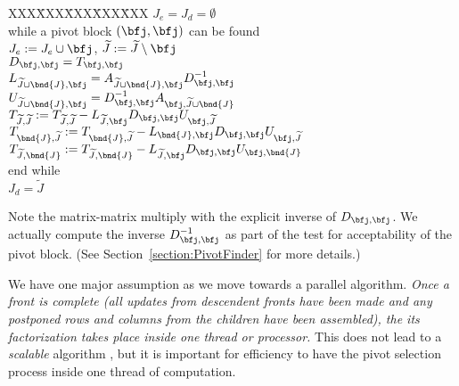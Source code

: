 \begin{center}
\begin{minipage}{3.5 in}
\begin{tabbing}
XXX\=XXX\=XXX\=XXX\=XXX\kill
$J_e = J_d = \emptyset$ \\
while a pivot block $(\bfj, \bfj)$ can be found \\
\> $J_e := J_e \cup \bfj$,
   ${\widetilde J} := {\widetilde J} \setminus \bfj$ \\
\> $D_{\bfj,\bfj} = T_{\bfj,\bfj}$\\
\> $L_{{\widetilde J}\cup\bnd{J},\bfj} 
      = A_{{\widetilde J}\cup\bnd{J},\bfj} D_{\bfj,\bfj}^{-1}$\\
\> $U_{{\widetilde J}\cup\bnd{J},\bfj} 
      = D_{\bfj,\bfj}^{-1} A_{\bfj,{\widetilde J}\cup\bnd{J}} $ \\
\> $T_{{\widetilde J}, {\widetilde J}}
   := T_{{\widetilde J}, {\widetilde J}}
    - L_{{\widetilde J}, \bfj} D_{\bfj,\bfj} U_{\bfj,{\widetilde J}}$ \\
\> $T_{\bnd{J}, {\widetilde J}}
   := T_{\bnd{J}, {\widetilde J}}
    - L_{\bnd{J}, \bfj} D_{\bfj,\bfj} U_{\bfj,{\widetilde J}}$ \\
\> $T_{{\widetilde J}, \bnd{J}}
   := T_{{\widetilde J}, \bnd{J}}
    - L_{{\widetilde J}, \bfj} D_{\bfj,\bfj} U_{\bfj,\bnd{J}}$\\
end while \\
$J_d = {\widetilde J}$
\end{tabbing}
\end{minipage}
\end{center}
Note the matrix-matrix multiply with the explicit inverse
of $D_{\bfj,\bfj}$.
We actually compute the inverse
$D_{\bfj,\bfj}^{-1}$ as part of the test for acceptability 
of the pivot block.
(See Section~\ref{section:PivotFinder} for more details.)
\par \bigskip \par
{}
\par \bigskip \par
We have one major assumption as we move towards a parallel
algorithm. {\it 
Once a front is complete (all updates from descendent fronts
have been made and any postponed rows and columns from the children
have been assembled), the its factorization takes place inside
one thread or processor.}
This does not lead to a {\it scalable} algorithm
\cite{sch93-scalability}, but it is important for efficiency to
have the pivot selection process inside one thread of computation.
\par
